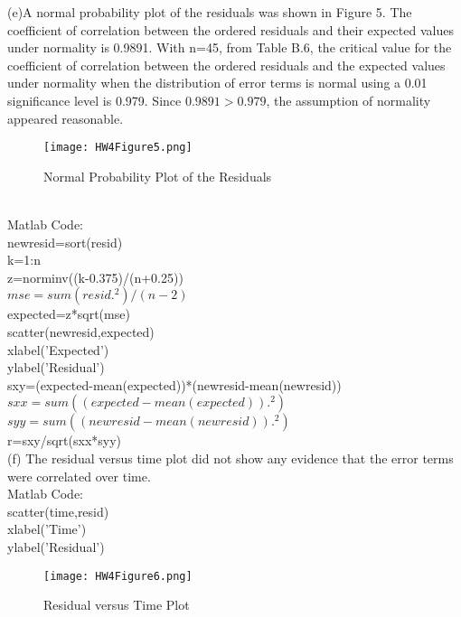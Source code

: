 \documentclass[12pt]{article}
\begin{document}
(e)A normal probability plot of the residuals was shown in Figure 5.  The coefficient of correlation between the ordered residuals and their expected values under normality is 0.9891. With n=45, from Table B.6, the critical value for the coefficient of correlation between the ordered residuals and the expected values under normality when the distribution of error terms is normal using a 0.01 significance level is 0.979. Since $ 0.9891>0.979$, the assumption of normality appeared reasonable. \\
\begin{figure}[h!]
\centering
\graphicspath{{c:/users/qun/desktop/}}
\texttt{[image: HW4Figure5.png]}
\caption{Normal Probability Plot of the Residuals}
\end{figure}\\
Matlab Code:\\
newresid=sort(resid)\\
k=1:n\\
z=norminv((k-0.375)/(n+0.25))\\
$mse=sum(resid.^2)/(n-2)$\\
expected=z*sqrt(mse)\\
scatter(newresid,expected)\\
xlabel('Expected')\\
ylabel('Residual')\\
sxy=(expected-mean(expected))*(newresid-mean(newresid))\\
$sxx=sum((expected-mean(expected)).^2)$\\
$syy=sum((newresid-mean(newresid)).^2)$\\
r=sxy/sqrt(sxx*syy)\\

(f) The residual versus time plot did not show any evidence that the error terms were correlated over time. \\
Matlab Code:\\
scatter(time,resid)\\
xlabel('Time')\\
ylabel('Residual')\\
\begin{figure}[h!]
\centering
\graphicspath{{c:/users/qun/desktop/}}
\texttt{[image: HW4Figure6.png]}
\caption{ Residual versus Time Plot}
\end{figure}
\end{document}

